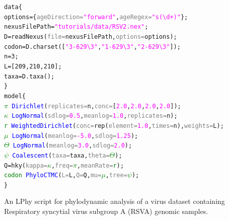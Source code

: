 \documentclass[10pt,letterpaper,table]{article}
\begin{document}
{
  \small
  \begin{listing}
    \begin{alltt}
      data \{
      options = \{\textcolor{gray}{ageDirection=}\textcolor{magenta}{"forward"}, \textcolor{gray}{ageRegex=}\textcolor{magenta}{"s(\textbackslash{}d+)"}\};
      nexusFilePath = \textcolor{magenta}{"tutorials/data/RSV2.nex"};
      D = \textcolor{magenta!80!black}{readNexus}(\textcolor{gray}{file=}nexusFilePath, \textcolor{gray}{options=}options);
      codon = D.\textcolor{magenta!80!black}{charset}([\textcolor{magenta}{"3-629\textbackslash{}3"}, \textcolor{magenta}{"1-629\textbackslash{}3"}, \textcolor{magenta}{"2-629\textbackslash{}3"}]);
      n = 3;
      L = [209, 210, 210];
      taxa = D.\textcolor{magenta!80!black}{taxa}();
      \}
      model \{
      \textcolor{green}{\(\pi\)} ~ \textcolor{blue}{Dirichlet}(\textcolor{gray}{replicates=}n, \textcolor{gray}{conc=}[\textcolor{magenta}{2.0}, \textcolor{magenta}{2.0}, \textcolor{magenta}{2.0}, \textcolor{magenta}{2.0}]);
      \textcolor{green}{\(\kappa\)} ~ \textcolor{blue}{LogNormal}(\textcolor{gray}{sdlog=}\textcolor{magenta}{0.5}, \textcolor{gray}{meanlog=}\textcolor{magenta}{1.0}, \textcolor{gray}{replicates=}n);
      \textcolor{green}{r} ~ \textcolor{blue}{WeightedDirichlet}(\textcolor{gray}{conc=}\textcolor{magenta!80!black}{rep}(\textcolor{gray}{element=}\textcolor{magenta}{1.0}, \textcolor{gray}{times=}n), \textcolor{gray}{weights=}L);
      \textcolor{green}{\(\mu\)} ~ \textcolor{blue}{LogNormal}(\textcolor{gray}{meanlog=}\textcolor{magenta}{-5.0}, \textcolor{gray}{sdlog=}\textcolor{magenta}{1.25});
      \textcolor{green}{\(\Theta\)} ~ \textcolor{blue}{LogNormal}(\textcolor{gray}{meanlog=}\textcolor{magenta}{3.0}, \textcolor{gray}{sdlog=}\textcolor{magenta}{2.0});
      \textcolor{green}{\(\psi\)} ~ \textcolor{blue}{Coalescent}(\textcolor{gray}{taxa=}taxa, \textcolor{gray}{theta=}\textcolor{green}{\(\Theta\)});
      Q = \textcolor{magenta!80!black}{hky}(\textcolor{gray}{kappa=}\textcolor{green}{\(\kappa\)}, \textcolor{gray}{freq=}\textcolor{green}{\(\pi\)}, \textcolor{gray}{meanRate=}\textcolor{green}{r});
      \textcolor{green}{codon} ~ \textcolor{blue}{PhyloCTMC}(\textcolor{gray}{L=}L, \textcolor{gray}{Q=}Q, \textcolor{gray}{mu=}\textcolor{green}{\(\mu\)}, \textcolor{gray}{tree=}\textcolor{green}{\(\psi\)});
      \}
    \end{alltt}
    \caption{An LPhy script for phylodynamic analysis of a virus dataset containing Respiratory syncytial virus subgroup A (RSVA) genomic samples.
    \newline}
    \label{lphy:rsva}
  \end{listing}
}
\end{document}
